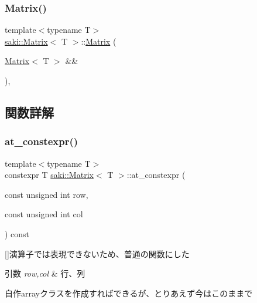 \subsubsection{\texorpdfstring{Matrix()}{Matrix()}\hspace{0.1cm}{\footnotesize\ttfamily [5/5]}}
{\footnotesize\ttfamily template$<$typename T$>$ \\
\mbox{\hyperlink{classsaki_1_1_matrix}{saki\+::\+Matrix}}$<$ T $>$\+::\mbox{\hyperlink{classsaki_1_1_matrix}{Matrix}} (\begin{DoxyParamCaption}\item[{\mbox{\hyperlink{classsaki_1_1_matrix}{Matrix}}$<$ T $>$ \&\&}]{ }\end{DoxyParamCaption})\hspace{0.3cm}{\ttfamily [default]}, {\ttfamily [noexcept]}}



\subsection{関数詳解}
\mbox{\label{classsaki_1_1_matrix_ac9e6609628221255fd9577eceb9ab2af}} 
\subsubsection{\texorpdfstring{at\+\_\+constexpr()}{at\_constexpr()}}
{\footnotesize\ttfamily template$<$typename T$>$ \\
constexpr T \mbox{\hyperlink{classsaki_1_1_matrix}{saki\+::\+Matrix}}$<$ T $>$\+::at\+\_\+constexpr (\begin{DoxyParamCaption}\item[{const unsigned int}]{row,  }\item[{const unsigned int}]{col }\end{DoxyParamCaption}) const\hspace{0.3cm}{\ttfamily [inline]}}



\mbox{[}\mbox{]}演算子では表現できないため、普通の関数にした 


\begin{DoxyParams}{引数}
{\em row,col} & 行、列\\
\hline
\end{DoxyParams}
自作arrayクラスを作成すればできるが、とりあえず今はこのままで \mbox{\label{classsaki_1_1_matrix_af0c4f3614c29e27eae5fecde22140be8}} 
